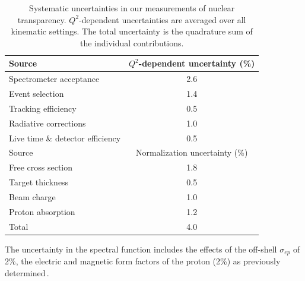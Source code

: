 \begin{table}[htb!]
    \caption{
        Systematic uncertainties in our measurements of nuclear
        transparency.
        $Q^2$-dependent uncertainties are averaged over all kinematic settings.
        The total uncertainty is the quadrature sum of the individual
        contributions.
    }
    \label{tab:systematic_uncertainty}
    \centering
    \begin{tabular}{lc}
        \hline
        \hline
        Source                            & $Q^2$-dependent uncertainty (\%) \\
        \hline
        Spectrometer acceptance           & 2.6                              \\
        Event selection                   & 1.4                              \\
        Tracking efficiency               & 0.5                              \\
        Radiative corrections             & 1.0                              \\
        Live time \& detector efficiency  & 0.5                              \\
        \hline
        \hline
        Source                            & Normalization uncertainty (\%)   \\
        \hline
        Free cross section                & 1.8                              \\
        Target thickness                  & 0.5                              \\
        Beam charge                       & 1.0                              \\
        Proton absorption                 & 1.2                              \\
        \hline
        \hline
        Total                             & 4.0                              \\
    \end{tabular}
\end{table}

The uncertainty in the spectral function includes the effects of the off-shell
$\sigma_{ep}$ of 2\%, the electric and magnetic form factors of the proton (2\%)
as previously determined\,\cite{ONeill_1995}.
